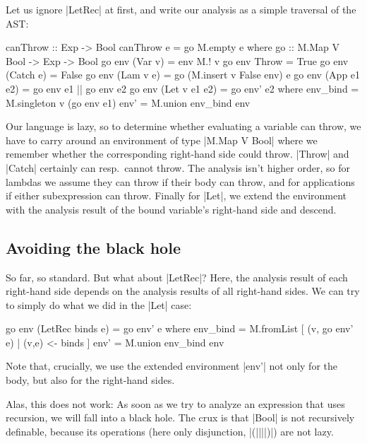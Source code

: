 \documentclass[manuscript,review,screen,acmsmall]{acmart}
\begin{document}
Let us ignore |LetRec| at first, and write our analysis as a simple traversal of the AST:
\nopagebreak
\savecolumns
\begin{code}
canThrow :: Exp -> Bool
canThrow e = go M.empty e
  where
    go :: M.Map V Bool -> Exp -> Bool
    go env (Var v)        = env M.! v
    go env Throw          = True
    go env (Catch e)      = False
    go env (Lam v e)      = go (M.insert v False env) e
    go env (App e1 e2)    = go env e1 || go env e2
    go env (Let v e1 e2)  = go env' e2
      where
        env_bind  = M.singleton v (go env e1)
        env'      = M.union env_bind env
\end{code}

Our language is lazy, so to determine whether evaluating a variable can throw,
we have to carry around an
environment of type |M.Map V Bool| where we remember whether the corresponding right-hand side could throw. |Throw| and |Catch| certainly can resp.\ cannot throw. The analysis isn't higher order, so for lambdas we assume they can throw if their body can throw, and for applications if either subexpression can throw. Finally for |Let|, we extend the environment with the analysis result of the bound variable's right-hand side and descend.

\subsection{Avoiding the black hole}
So far, so standard. But what about |LetRec|? Here, the analysis result of each right-hand side depends on the analysis results of all right-hand sides. We can try to simply do what we did in the |Let| case:
\restorecolumns
\begin{code}
    go env (LetRec binds e) = go env' e
      where
        env_bind  = M.fromList [ (v, go env' e) | (v,e) <- binds ]
        env'      = M.union env_bind env
\end{code}
Note that, crucially, we use the extended environment |env'| not only for the body, but also for the right-hand sides.

Alas, this does not work: As soon as we try to analyze an expression that uses recursion, we will fall into a black hole. The crux is that |Bool| is not recursively definable, because its operations (here only disjunction, |(||||)|) are not lazy.
\end{document}
